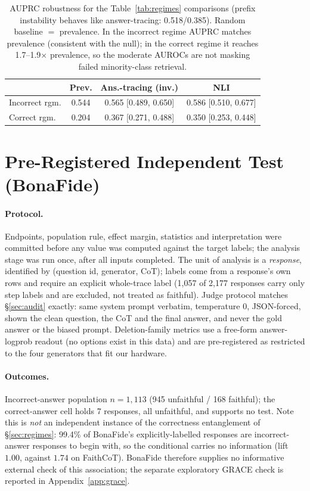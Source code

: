 \documentclass[11pt]{article}
\begin{document}
\begin{table}[t]
\centering
\small
\begin{tabular}{@{}lccc@{}}
\toprule
 & \textbf{Prev.} & \textbf{Ans.-tracing (inv.)} & \textbf{NLI} \\
\midrule
Incorrect rgm. & 0.544 & 0.565 [0.489, 0.650] & 0.586 [0.510, 0.677] \\
Correct rgm. & 0.204 & 0.367 [0.271, 0.488] & 0.350 [0.253, 0.448] \\
\bottomrule
\end{tabular}
\caption{AUPRC robustness for the Table~\ref{tab:regimes} comparisons (prefix instability behaves like answer-tracing: 0.518/0.385). Random baseline $=$ prevalence. In the incorrect regime AUPRC matches prevalence (consistent with the null); in the correct regime it reaches 1.7--1.9$\times$ prevalence, so the moderate AUROCs are not masking failed minority-class retrieval.}
\label{tab:auprc}
\end{table}

\section{Pre-Registered Independent Test (BonaFide)}
\label{app:bonafide}

\paragraph{Protocol.} Endpoints, population rule, effect margin, statistics and interpretation were
committed before any value was computed against the target labels; the analysis stage was run once,
after all inputs completed. The unit of analysis is a \emph{response}, identified by
(question id, generator, CoT); labels come from a response's own rows and require an explicit
whole-trace label (1{,}057 of 2{,}177 responses carry only step labels and are excluded, not
treated as faithful). Judge protocol matches \S\ref{sec:audit} exactly: same system prompt
verbatim, temperature 0, JSON-forced, shown the clean question, the CoT and the final answer, and
never the gold answer or the biased prompt. Deletion-family metrics use a free-form answer-logprob
readout (no options exist in this data) and are pre-registered as restricted to the four
generators that fit our hardware.

\paragraph{Outcomes.} Incorrect-answer population $n{=}1{,}113$ (945 unfaithful / 168 faithful);
the correct-answer cell holds 7 responses, all unfaithful, and supports no test. Note this is
\emph{not} an independent instance of the correctness entanglement of \S\ref{sec:regimes}: 99.4\% of
BonaFide's explicitly-labelled responses are incorrect-answer responses to begin with, so the
conditional carries no information (lift $1.00$, against $1.74$ on FaithCoT). BonaFide therefore supplies no informative external check of this association;
the separate exploratory GRACE check is reported in Appendix~\ref{app:grace}.
\end{document}
